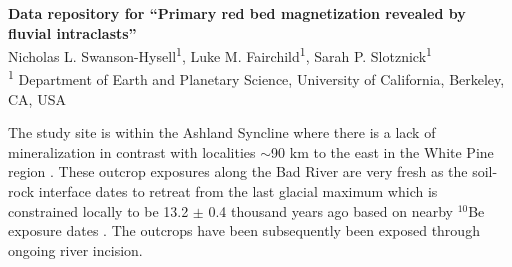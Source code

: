\documentclass[11pt,letterpaper]{article}
\begin{document}
\begin{flushleft}
{\Large \textbf{Data repository for ``Primary red bed magnetization revealed by fluvial intraclasts''}}
\\
Nicholas L. Swanson-Hysell\textsuperscript{1},
Luke M. Fairchild\textsuperscript{1},
Sarah P. Slotznick\textsuperscript{1}
\\
\bigskip
\textsuperscript{1} Department of Earth and Planetary Science, University of California, Berkeley, CA, USA
\bigskip

\end{flushleft}

The study site is within the Ashland Syncline where there is a lack of mineralization in contrast with localities $\sim$90 km to the east in the White Pine region \citep{Stewart2017a}. These outcrop exposures along the Bad River are very fresh as the soil-rock interface dates to retreat from the last glacial maximum which is constrained locally to be 13.2 $\pm$ 0.4 thousand years ago based on nearby $^{10}$Be exposure dates \citep{Ullman2015a}. The outcrops have been subsequently been exposed through ongoing river incision. 

\newpage



\end{document}
